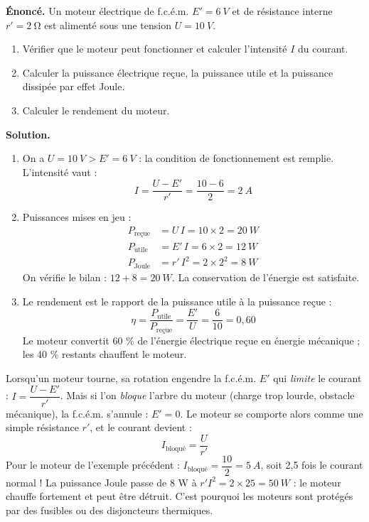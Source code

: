 \documentclass[11pt]{article}
\begin{document}
\begin{exoresolu}
\textbf{Énoncé.} Un moteur électrique de f.c.é.m. $E' = \SI{6}{V}$ et de résistance interne $r' = \SI{2}{\ohm}$ est alimenté sous une tension $U = \SI{10}{V}$.
\begin{enumerate}
\item Vérifier que le moteur peut fonctionner et calculer l'intensité $I$ du courant.
\item Calculer la puissance électrique reçue, la puissance utile et la puissance dissipée par effet Joule.
\item Calculer le rendement du moteur.
\end{enumerate}
\tcblower
\textbf{Solution.}
\begin{enumerate}
\item On a $U = \SI{10}{V} > E' = \SI{6}{V}$ : la condition de fonctionnement est remplie. L'intensité vaut :
\[ I = \frac{U - E'}{r'} = \frac{10 - 6}{2} = \SI{2}{A} \]
\item Puissances mises en jeu :
\begin{align*}
P_{\text{reçue}} &= U\,I = 10 \times 2 = \SI{20}{W} \\
P_{\text{utile}} &= E'\,I = 6 \times 2 = \SI{12}{W} \\
P_{\text{Joule}} &= r'\,I^2 = 2 \times 2^2 = \SI{8}{W}
\end{align*}
On vérifie le bilan : $12 + 8 = \SI{20}{W}$. La conservation de l'énergie est satisfaite.
\item Le rendement est le rapport de la puissance utile à la puissance reçue :
\[ \eta = \frac{P_{\text{utile}}}{P_{\text{reçue}}} = \frac{E'}{U} = \frac{6}{10} = 0,60 \]
Le moteur convertit 60 \% de l'énergie électrique reçue en énergie mécanique ; les 40 \% restants chauffent le moteur.
\end{enumerate}
\end{exoresolu}

\begin{attention}
Lorsqu'un moteur tourne, sa rotation engendre la f.c.é.m. $E'$ qui \emph{limite} le courant : $I = \dfrac{U - E'}{r'}$. Mais si l'on \emph{bloque} l'arbre du moteur (charge trop lourde, obstacle mécanique), la f.c.é.m. s'annule : $E' = 0$. Le moteur se comporte alors comme une simple résistance $r'$, et le courant devient :
\[ I_{\text{bloqué}} = \frac{U}{r'} \]
Pour le moteur de l'exemple précédent : $I_{\text{bloqué}} = \dfrac{10}{2} = \SI{5}{A}$, soit 2,5 fois le courant normal ! La puissance Joule passe de 8 W à $r'I^2 = 2 \times 25 = \SI{50}{W}$ : le moteur chauffe fortement et peut être détruit. C'est pourquoi les moteurs sont protégés par des fusibles ou des disjoncteurs thermiques.
\end{attention}
\end{document}
